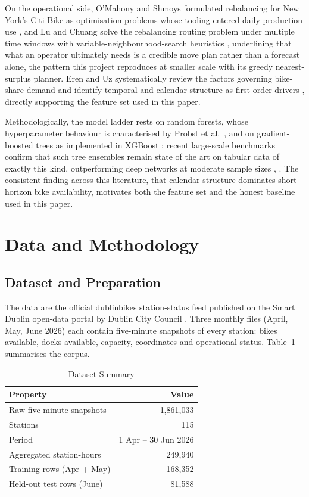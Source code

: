 \documentclass[conference]{IEEEtran}
\begin{document}
On the operational side, O'Mahony and Shmoys formulated rebalancing for New York's Citi Bike as optimisation problems whose tooling entered daily production use \cite{o2015data}, and Lu and Chuang solve the rebalancing routing problem under multiple time windows with variable-neighbourhood-search heuristics \cite{lu2024heuristic}, underlining that what an operator ultimately needs is a credible move plan rather than a forecast alone, the pattern this project reproduces at smaller scale with its greedy nearest-surplus planner. Eren and Uz systematically review the factors governing bike-share demand and identify temporal and calendar structure as first-order drivers \cite{eren2020review}, directly supporting the feature set used in this paper.

Methodologically, the model ladder rests on random forests, whose hyperparameter behaviour is characterised by Probst et al.\ \cite{probst2019hyperparameters}, and on gradient-boosted trees as implemented in XGBoost \cite{chen2016xgboost}; recent large-scale benchmarks confirm that such tree ensembles remain state of the art on tabular data of exactly this kind, outperforming deep networks at moderate sample sizes \cite{grinsztajn2022tree}, \cite{shwartzziv2022tabular}. The consistent finding across this literature, that calendar structure dominates short-horizon bike availability, motivates both the feature set and the honest baseline used in this paper.

\section{Data and Methodology}
\subsection{Dataset and Preparation}
The data are the official dublinbikes station-status feed published on the Smart Dublin open-data portal by Dublin City Council \cite{smartdublin2026}. Three monthly files (April, May, June 2026) each contain five-minute snapshots of every station: bikes available, docks available, capacity, coordinates and operational status. Table~\ref{tab:data} summarises the corpus.

\begin{table}[htbp]
\caption{Dataset Summary}
\begin{center}
\begin{tabular}{lr}
\hline
\textbf{Property} & \textbf{Value} \\
\hline
Raw five-minute snapshots & 1,861,033 \\
Stations & 115 \\
Period & 1 Apr -- 30 Jun 2026 \\
Aggregated station-hours & 249,940 \\
Training rows (Apr + May) & 168,352 \\
Held-out test rows (June) & 81,588 \\
\hline
\end{tabular}
\label{tab:data}
\end{center}
\end{table}
\end{document}
